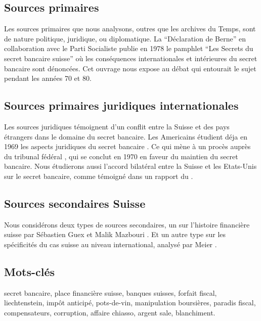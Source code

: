 \documentclass[11pt]{article}
\begin{document}
\subsection{Sources primaires}
Les sources primaires que nous analysons, outres que les archives du Temps, sont
de nature politique, juridique, ou diplomatique.
La “Déclaration de Berne” en collaboration avec le
Parti Socialiste publie en 1978 le pamphlet “Les Secrets du secret bancaire
suisse” \citep{GiovanniniPierLuigi1978Lsds} où les conséquences internationales
et intérieures du secret bancaire sont dénoncées. Cet ouvrage nous expose au
débat qui entourait le sujet pendant les années 70 et 80.

\subsection{Sources primaires juridiques internationales}
Les sources juridiques témoignent d'un conflit entre la Suisse et des pays
étrangers dans le domaine du secret bancaire.  Les Americains étudient déja en
1969 les aspects juridiques du secret bancaire \citep{Mueller69}. Ce qui mène à un
procès auprès du tribunal fédéral \citep{tribunalFederal70}, qui se
conclut en 1970 en faveur du maintien du secret bancaire.
Nous étudierons aussi l'accord bilatéral entre la Suisse et les Etats-Unis sur
le secret bancaire, comme témoigné dans un rapport du \citet{insiderTrading83}.

\subsection{Sources secondaires Suisse}
Nous considérons deux types de sources secondaires, un sur l’histoire financière suisse
 par Sébastien Guex et Malik Mazbouri \citep{Guex99, Guex00, Mazbouri12}.
Et un autre type sur les spécificités du cas suisse au niveau international, analysé par
Meier \citep{Meier12}.

\subsection{Mots-clés}
secret bancaire, place financière suisse, banques suisses, forfait
fiscal, liechtenstein, impôt anticipé, pots-de-vin, manipulation boursières,
paradis fiscal, compensateurs, corruption, affaire chiasso, argent sale,
blanchiment.
\end{document}
